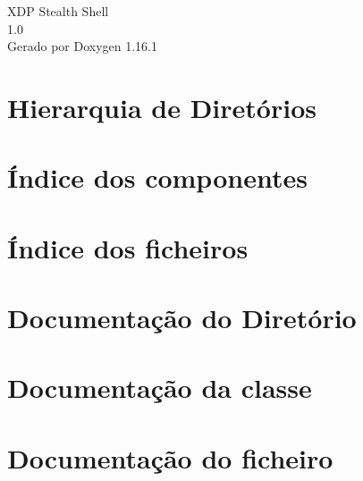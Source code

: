 \documentclass[twoside]{book}
\newcommand{\+}{\discretionary{\mbox{\scriptsize$\hookleftarrow$}}{}{}}
\newcommand{\clearemptydoublepage}{%
    \newpage{\pagestyle{empty}\cleardoublepage}%
  }
\begin{document}
  \raggedbottom
    \hypersetup{pageanchor=false,
                bookmarksnumbered=true,
                pdfencoding=unicode
               }
  \begin{titlepage}
  \vspace*{7cm}
  \begin{center}%
  {\Large XDP Stealth Shell}\\
  [1ex]\large 1.\+0 \\
  \vspace*{1cm}
  {\large Gerado por Doxygen 1.16.1}\\
  \end{center}
  \end{titlepage}
  \clearemptydoublepage
  \tableofcontents
  \clearemptydoublepage
  \hypersetup{pageanchor=true}
\chapter{Hierarquia de Diretórios}

\chapter{Índice dos componentes}

\chapter{Índice dos ficheiros}

\chapter{Documentação do Diretório}

\chapter{Documentação da classe}



\chapter{Documentação do ficheiro}








  \backmatter
  \newpage
  \clearemptydoublepage
  \printindex
\end{document}
